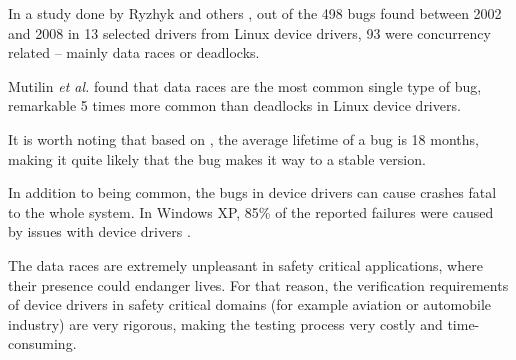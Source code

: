 \documentclass[..thesis.tex]{subfiles}
\begin{document}
In a study done by Ryzhyk and others \cite{ryzhyk_dingo_2009}, out of the 498 bugs found between 2002 and 2008 in 13 selected drivers from Linux device drivers, 93 were concurrency related -- mainly data races or deadlocks. 

Mutilin \textit{et al.} \cite{mutilin_analysis_2012} found that data races are the most common single type of bug, remarkable 5 times more common than deadlocks in Linux device drivers.

It is worth noting that based on \cite{chou_empirical_2001,palix_faults_2011}, the average lifetime of a bug is 18 months, making it quite likely that the bug makes it way to a stable version. 


In addition to being common, the bugs in device drivers can cause crashes fatal to the whole system. In Windows XP, 85\% of the reported failures were caused by issues with device drivers \cite{swift_improving_2003}.

The data races are extremely unpleasant in safety critical applications, where their presence could endanger lives. For that reason, the verification requirements of device drivers in safety critical domains (for example aviation or automobile industry) are very rigorous, making the testing process very costly and time-consuming.






\end{document}
